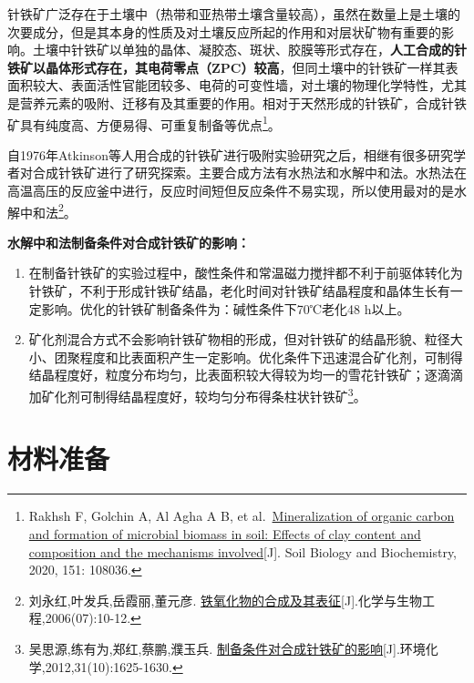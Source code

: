 \documentclass[
  letterpaper,
  DIV=11,
  numbers=noendperiod]{scrartcl}
\begin{document}
针铁矿广泛存在于土壤中（热带和亚热带土壤含量较高），虽然在数量上是土壤的次要成分，但是其本身的性质及对土壤反应所起的作用和对层状矿物有重要的影响。土壤中针铁矿以单独的晶体、凝胶态、斑状、胶膜等形式存在，\textbf{人工合成的针铁矿以晶体形式存在，其电荷零点（ZPC）较高}，但同土壤中的针铁矿一样其表面积较大、表面活性官能团较多、电荷的可变性墙，对土壤的物理化学特性，尤其是营养元素的吸附、迁移有及其重要的作用。相对于天然形成的针铁矿，合成针铁矿具有纯度高、方便易得、可重复制备等优点\footnote{Rakhsh
  F, Golchin A, Al Agha A B, et al.~\href{}{Mineralization of organic
  carbon and formation of microbial biomass in soil: Effects of clay
  content and composition and the mechanisms involved}{[}J{]}. Soil
  Biology and Biochemistry, 2020, 151: 108036.}。

自1976年Atkinson等人用合成的针铁矿进行吸附实验研究之后，相继有很多研究学者对合成针铁矿进行了研究探索。主要合成方法有水热法和水解中和法。水热法在高温高压的反应釜中进行，反应时间短但反应条件不易实现，所以使用最对的是水解中和法\footnote{刘永红,叶发兵,岳霞丽,董元彦.
  \href{https://kns.cnki.net/kcms/detail/detail.aspx?dbcode=CJFD\&dbname=CJFD2006\&filename=HBHG200607003\&uniplatform=NZKPT\&v=lAapXeiCwvyIGjrWJHKZjrtB_0ef5XTFpkSGFn65obDsNFp7-P8iz6zbinJPP1H5}{铁氧化物的合成及其表征}{[}J{]}.化学与生物工程,2006(07):10-12.}。

\textbf{水解中和法制备条件对合成针铁矿的影响：}

\begin{enumerate}
\def\labelenumi{\arabic{enumi}.}
\item
  在制备针铁矿的实验过程中，酸性条件和常温磁力搅拌都不利于前驱体转化为针铁矿，不利于形成针铁矿结晶，老化时间对针铁矿结晶程度和晶体生长有一定影响。优化的针铁矿制备条件为：碱性条件下70℃老化48
  h以上。
\item
  矿化剂混合方式不会影响针铁矿物相的形成，但对针铁矿的结晶形貌、粒径大小、团聚程度和比表面积产生一定影响。优化条件下迅速混合矿化剂，可制得结晶程度好，粒度分布均匀，比表面积较大得较为均一的雪花针铁矿；逐滴滴加矿化剂可制得结晶程度好，较均匀分布得条柱状针铁矿\footnote{吴思源,练有为,郑红,蔡鹏,濮玉兵.
    \href{https://kns.cnki.net/kcms/detail/detail.aspx?dbcode=CJFD\&dbname=CJFD2012\&filename=HJHX201210024\&uniplatform=NZKPT\&v=6MaQ-CmnMRBerybdZXrj-fwGF93WX3xs4k9-cDGherPIfJnJBK00SU6d2NWDliwb}{制备条件对合成针铁矿的影响}{[}J{]}.环境化学,2012,31(10):1625-1630.}。
\end{enumerate}

\hypertarget{ux6750ux6599ux51c6ux5907}{%
\section{材料准备}\label{ux6750ux6599ux51c6ux5907}}
\end{document}
